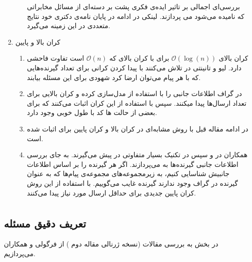 \begin{enumerate}
\begin{enumerate}
	\cite{7176784}
	بررسی‌ای اجمالی بر تاثیر ایده‌ی فکری پشت
	\picod
	بر دسته‌ای از مسائل مخابراتی که
	نامیده می‌شود می پردازند. لینکی در ادامه در پایان نامه‌ی دکتری خود
	\cite{linqiphd}
	نتایج متعددی در این زمینه می‌گیرد.
		\end{enumerate}
		\item کران بالا و پایین
		\begin{enumerate}
			\item 
			کران بالای
			$\mathcal{O}(\log(n))$
			برای
			\picod
			با کران بالای
			\icod
			که
			$\mathcal{O}(n)$
			است تفاوت فاحشی دارد. لیو و تانینتی در
			\cite{7606849}
		تلاش می‌کنند با پیدا کردن کرانی برای تعداد گیرنده‌هایی که با هر پیام می‌توان ارضا کرد شهودی برای این مسئله بیابند.
			\item 
			در
			\cite{9518120}
			گراف اطلاعات جانبی را با استفاده از 
			مدل‌سازی کرده و کران بالایی برای تعداد ارسال‌ها پیدا میکنند. سپس با استفاده از این کران اثبات می‌کنند که برای بعضی از حالت ها کد با طول خوبی وجود دارد.
			\item
			در ادامه مقاله قبل با روش مشابه‌ای در
			\cite{9965883}
			کران بالا و کران پایین برای
			\picod
			اثبات شده است.
					\item
					همکاران در
			\cite{ong2019improved}
			و سپس در
			\cite{8849527}
			تکنیک بسیار متفاوتی در پیش می‌گیرند. به جای بررسی اطلاعات جانبی گیرنده‌ها به 
		می‌پردازند. اگر هر گیرنده را بر اساس اطلاعات جانبیش شناسایی کنیم، به زیرمجموعه‌های مجموعه‌ی پیام‌ها که به عنوان گیرنده در گراف وجود ندارند گیرنده غایب می‌گوییم. با استفاده از این روش کران پایین جدیدی برای حداقل ارسال مورد نیاز پیدا می‌کنند.
		\end{enumerate}
\end{enumerate}


\section{
\picod
}
\subsection{تعریف دقیق مسئله}
\label{sec:3:3}
در بخش به بررسی مقالات
\cite{pliablefirstpaper,pliable2015paper,  song2017polynomialtime}
(نسخه ژرنالی مقاله دوم
\cite{7541273}
) از فرگولی و همکاران می‌پردازیم. 

